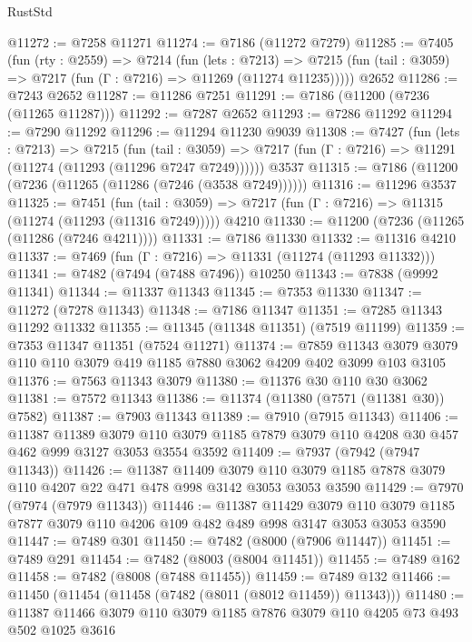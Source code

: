 \begin{lexlean}{RustStd}
\begin{coremodule}
@11272 := @7258 @11271
@11274 := @7186 (@11272 @7279)
@11285 := @7405
    (fun (rty : @2559) =>
    @7214
      (fun (lets : @7213) =>
      @7215 (fun (tail : @3059) => @7217 (fun (Γ : @7216) => @11269 (@11274 @11235)))))
    @2652
@11286 := @7243 @2652
@11287 := @11286 @7251
@11291 := @7186 (@11200 (@7236 (@11265 @11287)))
@11292 := @7287 @2652
@11293 := @7286 @11292
@11294 := @7290 @11292
@11296 := @11294 @11230 @9039
@11308 := @7427
    (fun (lets : @7213) =>
    @7215
      (fun (tail : @3059) =>
      @7217 (fun (Γ : @7216) => @11291 (@11274 (@11293 (@11296 @7247 @7249))))))
    @3537
@11315 := @7186 (@11200 (@7236 (@11265 (@11286 (@7246 (@3538 @7249))))))
@11316 := @11296 @3537
@11325 := @7451
    (fun (tail : @3059) => @7217 (fun (Γ : @7216) => @11315 (@11274 (@11293 (@11316 @7249)))))
    @4210
@11330 := @11200 (@7236 (@11265 (@11286 (@7246 @4211))))
@11331 := @7186 @11330
@11332 := @11316 @4210
@11337 := @7469 (fun (Γ : @7216) => @11331 (@11274 (@11293 @11332)))
@11341 := @7482 (@7494 (@7488 @7496)) @10250
@11343 := @7838 (@9992 @11341)
@11344 := @11337 @11343
@11345 := @7353 @11330
@11347 := @11272 (@7278 @11343)
@11348 := @7186 @11347
@11351 := @7285 @11343 @11292 @11332
@11355 := @11345 (@11348 @11351) (@7519 @11199)
@11359 := @7353 @11347 @11351 (@7524 @11271)
@11374 := @7859
    @11343
    @3079
    @3079
    @110
    @110
    @3079
    @419
    @1185
    @7880
    @3062
    @4209
    @402
    @3099
    @103
    @3105
@11376 := @7563 @11343 @3079
@11380 := @11376 @30 @110 @30 @3062
@11381 := @7572 @11343
@11386 := @11374 (@11380 (@7571 (@11381 @30)) @7582)
@11387 := @7903 @11343
@11389 := @7910 (@7915 @11343)
@11406 := @11387
    @11389
    @3079
    @110
    @3079
    @1185
    @7879
    @3079
    @110
    @4208
    @30
    @457
    @462
    @999
    @3127
    @3053
    @3554
    @3592
@11409 := @7937 (@7942 (@7947 @11343))
@11426 := @11387
    @11409
    @3079
    @110
    @3079
    @1185
    @7878
    @3079
    @110
    @4207
    @22
    @471
    @478
    @998
    @3142
    @3053
    @3053
    @3590
@11429 := @7970 (@7974 (@7979 @11343))
@11446 := @11387
    @11429
    @3079
    @110
    @3079
    @1185
    @7877
    @3079
    @110
    @4206
    @109
    @482
    @489
    @998
    @3147
    @3053
    @3053
    @3590
@11447 := @7489 @301
@11450 := @7482 (@8000 (@7906 @11447))
@11451 := @7489 @291
@11454 := @7482 (@8003 (@8004 @11451))
@11455 := @7489 @162
@11458 := @7482 (@8008 (@7488 @11455))
@11459 := @7489 @132
@11466 := @11450 (@11454 (@11458 (@7482 (@8011 (@8012 @11459)) @11343)))
@11480 := @11387 @11466 @3079 @110 @3079 @1185 @7876 @3079 @110 @4205 @73 @493 @502 @1025 @3616

\end{coremodule}
\end{lexlean}
